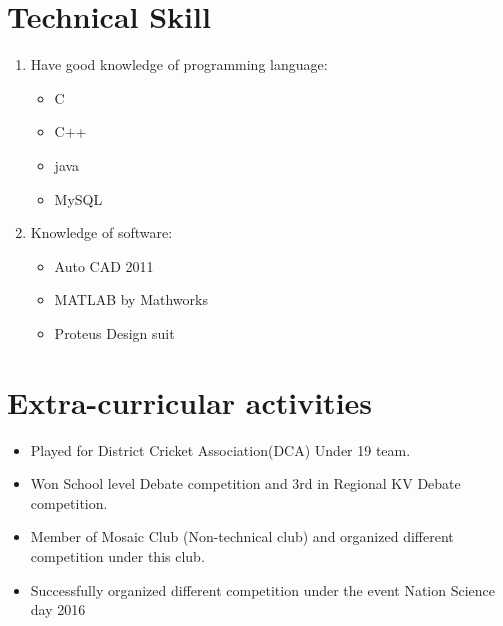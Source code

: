 \documentclass[11pt,a4paper]{article}
\begin{document}
\section*{Technical Skill}
\vspace{-0.7em}\hline \vspace{1.5em}
\begin{enumerate}
\item Have good knowledge of programming language:
\begin{itemize}
\item C
\item C++
\item java
\item MySQL
\end{itemize}
\item Knowledge of software:
\begin{itemize}
\item Auto CAD 2011
\item MATLAB by Mathworks
\item Proteus Design suit
\end{itemize}
\end{enumerate}

\section*{Extra-curricular activities}
\vspace{-0.7em}\hline \vspace{1.5em}
\begin{itemize}
\item Played for District Cricket Association(DCA) Under 19 team.
\item Won School level Debate competition and 3rd in Regional KV Debate competition.
\item Member of Mosaic Club (Non-technical club) and organized different competition under this club.
\item Successfully organized different competition under the event Nation Science day 2016
\end{itemize}
\end{document}
